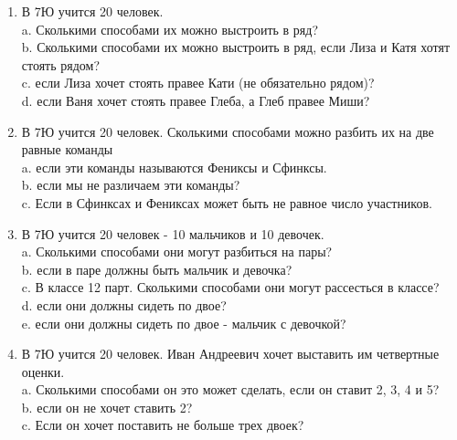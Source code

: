 \begin{enumerate}
	\item В 7Ю учится 20 человек. \\
	a.	Сколькими способами их можно выстроить в ряд? \\
	b.	Сколькими способами их можно выстроить в ряд, если Лиза и Катя хотят стоять рядом? \\
	c.	если Лиза хочет стоять правее Кати (не обязательно рядом)?\\
	d.	если Ваня хочет стоять правее Глеба, а Глеб правее Миши?
\item	В 7Ю учится 20 человек. Сколькими способами можно разбить их на две  равные команды\\
	a.	если эти команды называются Фениксы и Сфинксы.\\
	b.	если мы не различаем эти команды?\\
	c.	Если в Сфинксах и Фениксах может быть не равное число участников.
\item	В 7Ю учится 20 человек - 10 мальчиков и 10 девочек.\\
	a.	Сколькими способами они могут разбиться на пары?\\
	b.	если в паре должны быть мальчик и девочка?\\
	c.	В классе 12 парт. Сколькими способами они могут рассесться в классе?\\
	d.	если они должны сидеть по двое?\\
	e.	если они должны сидеть по двое - мальчик с девочкой?
\item	В 7Ю учится 20 человек. Иван Андреевич хочет выставить им четвертные оценки.\\
	a.	Сколькими способами он это может сделать, если он ставит 2, 3, 4 и 5?\\
	b.	если он не хочет ставить 2?\\
	c.	Если он хочет поставить не больше трех двоек?
\end{enumerate}
	 